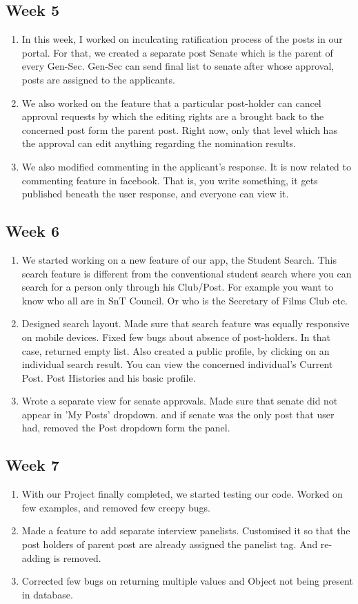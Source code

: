 \documentclass[12pt,a4paper]{scrartcl}
\begin{document}
\subsection{Week 5}
\begin{enumerate}
	\item In this week, I worked on inculcating ratification process of the posts in our portal. For that, we created a separate post Senate which is the parent of every Gen-Sec. Gen-Sec can send final list to senate after whose approval, posts are assigned to the applicants.
	\item We also worked on the feature that a particular post-holder can cancel approval requests by which the editing rights are a brought back to the concerned post form the parent post. Right now, only that level which has the approval can edit anything regarding the nomination results.
	\item We also modified commenting in the applicant's response. It is now related to commenting feature in facebook. That is, you write something, it gets published beneath the user response, and everyone can view it. 
\end{enumerate}

\subsection{Week 6}
\begin{enumerate}
	\item We started working on a new feature of our app, the Student Search. This search feature is different from the conventional student search where you can search for a person only through his Club/Post. For example you want to know who all are in SnT Council. Or who is the Secretary of Films Club etc.
	\item Designed search layout. Made sure that search feature was equally responsive on mobile devices. Fixed few bugs about absence of post-holders. In that case, returned empty list. Also created a public profile, by clicking on an individual search result. You can view the concerned individual's Current Post. Post Histories and his basic profile.
	\item Wrote a separate view for senate approvals. Made sure that senate did not appear in 'My Posts' dropdown. and if senate was the only post that user had, removed the Post dropdown form the panel. 
\end{enumerate}

\subsection{Week 7}
\begin{enumerate}
	\item With our Project finally completed, we started testing our code. Worked on few examples, and removed few creepy bugs.
	\item Made a feature to add separate interview panelists. Customised it so that the post holders of parent post are already assigned the panelist tag. And re-adding is removed. 
	\item Corrected few bugs on returning multiple values and Object not being present in database.
\end{enumerate}
\end{document}
